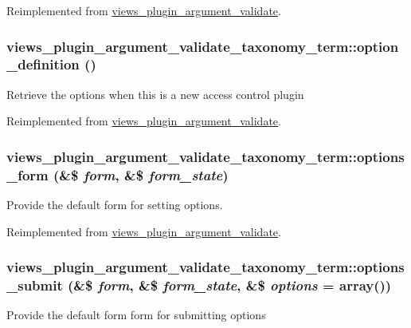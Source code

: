 Reimplemented from \hyperlink{classviews__plugin__argument__validate_a36d63524ce3cc1af5fd8b1e0d56e61ad}{views\_\-plugin\_\-argument\_\-validate}.\hypertarget{classviews__plugin__argument__validate__taxonomy__term_a480325496a1e66f3cdeb5fb354ca8746}{
\subsubsection[{option\_\-definition}]{\setlength{\rightskip}{0pt plus 5cm}views\_\-plugin\_\-argument\_\-validate\_\-taxonomy\_\-term::option\_\-definition ()}}
\label{classviews__plugin__argument__validate__taxonomy__term_a480325496a1e66f3cdeb5fb354ca8746}
Retrieve the options when this is a new access control plugin 

Reimplemented from \hyperlink{classviews__plugin__argument__validate_aebc7a373a95a76ecb64345f558453b2d}{views\_\-plugin\_\-argument\_\-validate}.\hypertarget{classviews__plugin__argument__validate__taxonomy__term_a01d0dacfd3e605a0466f9eef497b4e8f}{
\subsubsection[{options\_\-form}]{\setlength{\rightskip}{0pt plus 5cm}views\_\-plugin\_\-argument\_\-validate\_\-taxonomy\_\-term::options\_\-form (\&\$ {\em form}, \/  \&\$ {\em form\_\-state})}}
\label{classviews__plugin__argument__validate__taxonomy__term_a01d0dacfd3e605a0466f9eef497b4e8f}
Provide the default form for setting options. 

Reimplemented from \hyperlink{classviews__plugin__argument__validate_a619aac79800de4535d25fd93ce1f08cc}{views\_\-plugin\_\-argument\_\-validate}.\hypertarget{classviews__plugin__argument__validate__taxonomy__term_a2259ff87ac45f7a4862f89983869f580}{
\subsubsection[{options\_\-submit}]{\setlength{\rightskip}{0pt plus 5cm}views\_\-plugin\_\-argument\_\-validate\_\-taxonomy\_\-term::options\_\-submit (\&\$ {\em form}, \/  \&\$ {\em form\_\-state}, \/  \&\$ {\em options} = {\ttfamily array()})}}
\label{classviews__plugin__argument__validate__taxonomy__term_a2259ff87ac45f7a4862f89983869f580}
Provide the default form form for submitting options 

